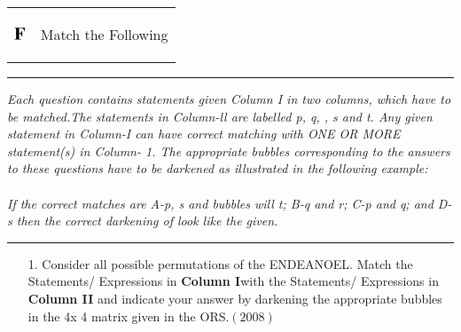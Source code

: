 \documentclass[journal,12pt,twocolumn]{IEEEtran}
\theoremstyle{remark}
\begin{document}
\newpage
\onecolumn
\begin{tabular}{p{1.5cm}p{10cm}}
   $\Large \textbf{F} $  &   \begin{Large}
   Match the Following 
   \end{Large}   
\end{tabular}
\noindent
\rule{1\textwidth}{1pt} %

\noindent
\begin{minipage}[t]{0.69\textwidth} 
    \textit{Each question contains statements given Column I in two columns, which have to be matched.The statements in Column-ll are labelled p, q, , s and t. Any given statement in Column-I can have correct matching with ONE OR MORE statement(s) in Column- 1. The appropriate bubbles corresponding to the answers to these questions have to be darkened as illustrated in the following example: }\\ \\
    \textit{If the correct matches are A-p, s and
bubbles will
t; B-q and r; C-p and q; and D-s then the correct darkening of look like the given.} 

    
\end{minipage}
\hfill
\begin{minipage}[t]{0.3\textwidth} 
    
\end{minipage}
\noindent
\rule{1\textwidth}{1pt} %

\begin{enumerate}
    \item[1. ] Consider all possible permutations of the ENDEANOEL. Match the Statements/ Expressions in
\textbf{Column I}with the Statements/ Expressions in \textbf{Column II} and indicate your answer by darkening
the appropriate bubbles in the 4x 4 matrix given in the ORS.\hfill $(2008)$\\  
    
\end{enumerate}
\end{document}
